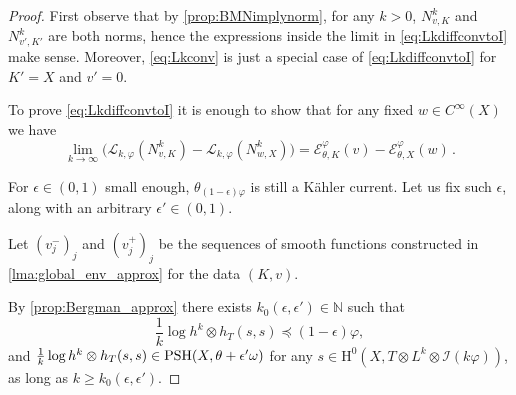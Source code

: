 \begin{proof}
First observe that by \cref{prop:BMNimplynorm}, for any $k>0$, $N^k_{v,K}$ and $N^k_{v',K'}$ are both norms, hence the expressions inside the limit in \eqref{eq:LkdiffconvtoI} make sense. Moreover, \eqref{eq:Lkconv} is just a special case of \eqref{eq:LkdiffconvtoI} for $K'=X$ and $v'= 0$.

To prove \eqref{eq:LkdiffconvtoI} it is enough to show that for any fixed $w \in C^\infty(X)$ we have
\begin{equation}\label{eq:inproofLdiffsmw}
\lim_{k\to\infty} \big( \mathcal{L}_{k,\varphi}(N^k_{v,K}) - \mathcal{L}_{k,\varphi}(N^k_{w,X}) \big) = \mathcal{E}_{\theta,K}^{\varphi}(v) - \mathcal{E}_{\theta,X}^{\varphi}(w)\,.
\end{equation}


For $\epsilon \in (0,1)$ small enough, $\theta_{(1-\epsilon)\varphi}$ is still a Kähler current. Let us fix such $\epsilon$, along with an arbitrary $\epsilon' \in (0,1)$.

Let $(v^-_{j})_j$ and $(v^+_{j})_j$ be the sequences of smooth functions constructed in \cref{lma:global_env_approx} for the data $(K,v)$.

By \cref{prop:Bergman_approx} there exists $k_0(\epsilon,\epsilon') \in \mathbb N$ such that
\[
\frac{1}{k} \log h^k \otimes h_T (s,s) \preceq (1-\epsilon)\varphi,
\]
and $\frac{1}{k} \log h^k \otimes h_T (s,s) \in \mathrm{PSH}(X,\theta + \epsilon'\omega)$ for any $s \in \mathrm{H}^0(X,T\otimes L^k \otimes \mathcal{I}(k\varphi))$, as long as $k \geq k_0(\epsilon,\epsilon')$.


\end{proof}

